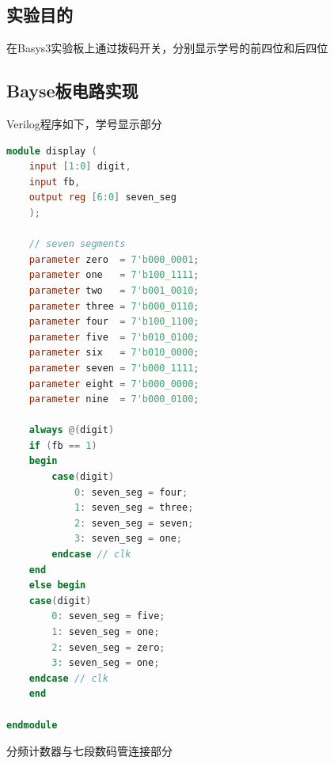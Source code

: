 \documentclass[11pt,UTF8]{ctexart}
\begin{document}
\subsection{实验目的}
在Basys3实验板上通过拨码开关，分别显示学号的前四位和后四位

\subsection{Bayse板电路实现}
\par Verilog程序如下，学号显示部分
\begin{lstlisting}[language=Verilog]
module display (
    input [1:0] digit,
    input fb,
    output reg [6:0] seven_seg
    );

    // seven segments
    parameter zero  = 7'b000_0001;
    parameter one   = 7'b100_1111;
    parameter two   = 7'b001_0010;
    parameter three = 7'b000_0110;
    parameter four  = 7'b100_1100;
    parameter five  = 7'b010_0100;
    parameter six   = 7'b010_0000;
    parameter seven = 7'b000_1111;
    parameter eight = 7'b000_0000;
    parameter nine  = 7'b000_0100;

    always @(digit)
    if (fb == 1)
    begin
        case(digit)
            0: seven_seg = four;
            1: seven_seg = three;
            2: seven_seg = seven;
            3: seven_seg = one;
        endcase // clk
    end
    else begin
    case(digit)
        0: seven_seg = five;
        1: seven_seg = one;
        2: seven_seg = zero;
        3: seven_seg = one;
    endcase // clk
    end

endmodule
\end{lstlisting}
\par 分频计数器与七段数码管连接部分
\end{document}
